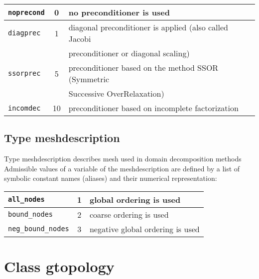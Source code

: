\begin{center}
\begin{tabular}{|l|c|l|}
\hline
{\tt noprecond} & 0 & no preconditioner is used
\\ \hline
{\tt diagprec} & 1 & diagonal preconditioner is applied (also called Jacobi
\\
 & & preconditioner or diagonal scaling)
\\ \hline
{\tt ssorprec} & 5 & preconditioner based on the method SSOR (Symmetric
\\
 & & Successive OverRelaxation)
\\ \hline
{\tt incomdec} & 10 & preconditioner based on incomplete factorization
\\ \hline
\end{tabular}
\end{center}






\section{Type {\sf meshdescription}}
\label{sectmeshdescription}
Type {\sf meshdescription} describes mesh used in domain decomposition methods
Admissible values of a variable of the {\sf meshdescription} are defined by a list of symbolic constant names (aliases)
and their numerical representation:

\begin{center}
\begin{tabular}{|l|c|l|}
\hline
{\tt all\_nodes} & 1 & global ordering is used
\\ \hline
{\tt bound\_nodes} & 2 & coarse ordering is used
\\ \hline
{\tt neg\_bound\_nodes} & 3 & negative global ordering is used
\\ \hline
\end{tabular}
\end{center}


\chapter{Class {\sf gtopology}}

